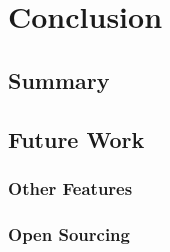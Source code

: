 \chapter{Conclusion}
\section{Summary}
\section{Future Work}
%
% 
\subsection{Other Features}
\subsection{Open Sourcing}
